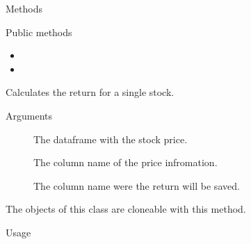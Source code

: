 \documentclass[a4paper]{book}
\begin{document}
\begin{Section}{Methods}
%
\begin{SubSection}{Public methods}
\begin{itemize}

\item{} 
\item{} 

\end{itemize}

\end{SubSection}



\hypertarget{method-LogReturn-calculate_return}{}
%
\begin{SubSection}{}
Calculates the return for a
single stock.
%

%
\begin{SubSubSection}{Arguments}

\begin{description}

\item[] The dataframe with the stock price.
\item[] The column name of the price
infromation.
\item[] The column name were the
return will be saved.

\end{description}



\end{SubSubSection}

\end{SubSection}




\hypertarget{method-LogReturn-clone}{}
%
\begin{SubSection}{}
The objects of this class are cloneable with this method.
%
\begin{SubSubSection}{Usage}


\end{SubSubSection}
\end{SubSection}
\end{Section}
\end{document}
